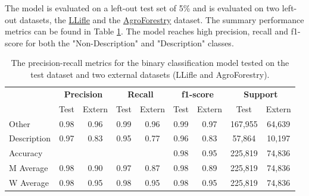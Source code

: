 \documentclass[a4paper, 12pt, oneside]{book} %
\begin{document}
The model is evaluated on a left-out test set of 5\% and is evaluated on two left-out datasets, the \href{http://www.llifle.com/}{LLifle} and the \href{https://www.worldagroforestry.org/}{AgroForestry} dataset.
The summary performance metrics can be found in Table \ref{tab:precision_recall_metrics}.
The model reaches high precision, recall and f1-score for both the "Non-Description" and "Description" classes.
\begin{table}[htpb]
\centering
\caption[Precision-recall metrics test and two left out datasets]{The precision-recall metrics for the binary classification model tested on the test dataset and two external datasets (LLifle and AgroForestry).}
\label{tab:precision_recall_metrics}
\begin{tabular}{@{}lcccccccc@{}}
\cmidrule(l){2-9}
 & \multicolumn{2}{c}{\textbf{Precision}} & \multicolumn{2}{c}{\textbf{Recall}} & \multicolumn{2}{c}{\textbf{f1-score}} & \multicolumn{2}{c}{\textbf{Support}} \\ \cmidrule(l){2-9} 
                 & Test & Extern & Test & Extern & Test & Extern & Test    & Extern \\ \midrule
Other            & 0.98 & 0.96   & 0.99 & 0.96   & 0.99 & 0.97   & 167,955 & 64,639 \\
Description      & 0.97 & 0.83   & 0.95 & 0.77   & 0.96 & 0.83   & 57,864  & 10,197  \\ \midrule
Accuracy         &      &        &      &        & 0.98 & 0.95   & 225,819 & 74,836 \\
M Average        & 0.98 & 0.90   & 0.97 & 0.87   & 0.98 & 0.89   & 225,819 & 74,836 \\
W Average        & 0.98 & 0.95   & 0.98 & 0.95   & 0.98 & 0.95   & 225,819 & 74,836 \\ \bottomrule
\end{tabular}
\end{table}
\end{document}
